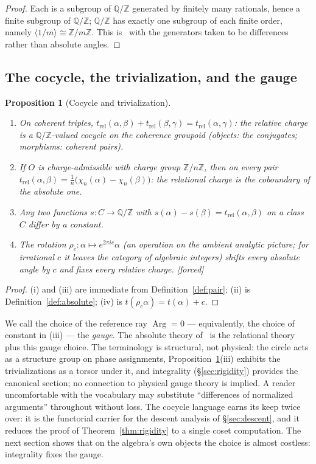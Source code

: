 \documentclass[11pt]{article}
\theoremstyle{plain}
\newtheorem{proposition}[theorem]{Proposition}
\theoremstyle{definition}
\theoremstyle{remark}
\newcommand{\Q}{\mathbb{Q}}
\newcommand{\Z}{\mathbb{Z}}
\DeclareMathOperator{\Arg}{Arg}
\newcommand{\tors}{\Q/\Z}
\newcommand{\F}{\textnormal{[forced]}}
\begin{document}
\begin{proof}
Each is a subgroup of $\tors$ generated by finitely many rationals, hence a finite
subgroup of $\tors$; $\tors$ has exactly one subgroup of each finite order,
namely $\langle 1/m\rangle\cong\Z/m\Z$. This is~\cite[Thm.~3.1]{CMC} with the
generators taken to be differences rather than absolute angles.
\end{proof}

\subsection{The cocycle, the trivialization, and the gauge}

\begin{proposition}[Cocycle and trivialization]\label{prop:gauge}
\leavevmode
\begin{enumerate}
\item[(i)] On coherent triples, $t_{\mathrm{rel}}(\alpha,\beta)+
  t_{\mathrm{rel}}(\beta,\gamma)=t_{\mathrm{rel}}(\alpha,\gamma)$: the relative
  charge is a $\tors$-valued cocycle on the coherence groupoid (objects: the
  conjugates; morphisms: coherent pairs).
\item[(ii)] If $O$ is charge-admissible with charge group $\Z/n\Z$, then on every
  pair $t_{\mathrm{rel}}(\alpha,\beta)=\frac{1}{n}\bigl(\chi_n(\alpha)-
  \chi_n(\beta)\bigr)$: the relational charge is the coboundary of the absolute
  one.
\item[(iii)] Any two functions $s:C\to\tors$ with $s(\alpha)-s(\beta)=
  t_{\mathrm{rel}}(\alpha,\beta)$ on a class $C$ differ by a constant.
\item[(iv)] The rotation $\rho_c:\alpha\mapsto e^{2\pi ic}\alpha$ (an operation on
  the ambient analytic picture; for irrational $c$ it leaves the category of
  algebraic integers) shifts every absolute angle by $c$ and fixes every relative
  charge. \F
\end{enumerate}
\end{proposition}

\begin{proof}
(i) and (iii) are immediate from Definition~\ref{def:pair}; (ii) is
Definition~\ref{def:absolute}; (iv) is $t(\rho_c\alpha)=t(\alpha)+c$.
\end{proof}

We call the choice of the reference ray $\Arg=0$ --- equivalently, the choice of
constant in (iii) --- the \emph{gauge}. The absolute theory of~\cite{CMC} is the
relational theory plus this gauge choice. The terminology is structural, not
physical: the circle acts as a structure group on phase assignments,
Proposition~\ref{prop:gauge}(iii) exhibits the trivializations as a torsor
under it, and integrality (\S\ref{sec:rigidity}) provides the canonical
section; no connection to physical gauge theory is implied. A reader
uncomfortable with the vocabulary may substitute ``differences of
normalized arguments'' throughout without loss. The cocycle
language earns its keep twice over: it is the functorial carrier for the
descent analysis of \S\ref{sec:descent}, and it reduces the proof of
Theorem~\ref{thm:rigidity} to a single coset computation. The next section
shows that on the
algebra's own objects the choice is almost costless: integrality fixes the gauge.
\end{document}
